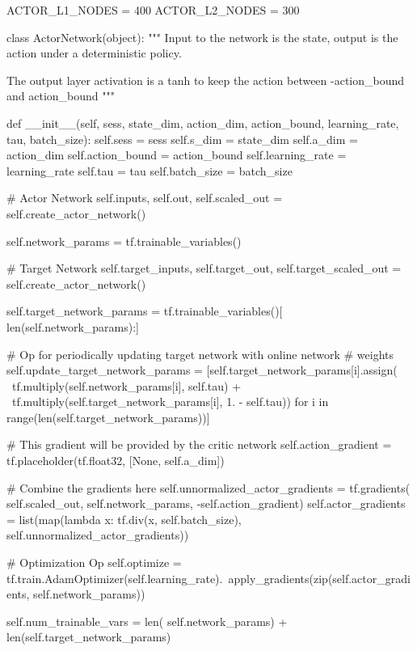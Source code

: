 \begin{python}[caption={Actor Network Class},label={list:actor_net}]
ACTOR_L1_NODES = 400
ACTOR_L2_NODES = 300

class ActorNetwork(object):
    """
    Input to the network is the state, output is the action
    under a deterministic policy.

    The output layer activation is a tanh to keep the action
    between -action_bound and action_bound
    """

    def __init__(self, sess, state_dim, action_dim, action_bound, learning_rate, tau, batch_size):
        self.sess = sess
        self.s_dim = state_dim
        self.a_dim = action_dim
        self.action_bound = action_bound
        self.learning_rate = learning_rate
        self.tau = tau
        self.batch_size = batch_size

        # Actor Network
        self.inputs, self.out, self.scaled_out = self.create_actor_network()

        self.network_params = tf.trainable_variables()

        # Target Network
        self.target_inputs, self.target_out, self.target_scaled_out = self.create_actor_network()

        self.target_network_params = tf.trainable_variables()[
            len(self.network_params):]

        # Op for periodically updating target network with online network
        # weights
        self.update_target_network_params = [self.target_network_params[i].assign( \
                tf.multiply(self.network_params[i], self.tau) + \
                tf.multiply(self.target_network_params[i], 1. - self.tau))
                for i in range(len(self.target_network_params))]

        # This gradient will be provided by the critic network
        self.action_gradient = tf.placeholder(tf.float32, [None, self.a_dim])

        # Combine the gradients here
        self.unnormalized_actor_gradients = tf.gradients(
            self.scaled_out, self.network_params, -self.action_gradient)
        self.actor_gradients = list(map(lambda x: tf.div(x, self.batch_size), 
            self.unnormalized_actor_gradients))

        # Optimization Op
        self.optimize = tf.train.AdamOptimizer(self.learning_rate).\
            apply_gradients(zip(self.actor_gradients, self.network_params))

        self.num_trainable_vars = len(
            self.network_params) + len(self.target_network_params)


\end{python}
